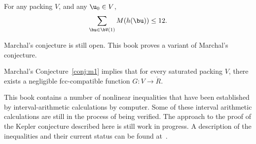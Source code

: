 \begin{conjecture}[Marchal]\label{conj:m1} For any packing $ V$, and
any $ \u_0\in V$,
\begin{displaymath}
\sum_{\bu\in \bV(1)} M(h(\bu)) \le 12.
\end{displaymath}
\end{conjecture}

Marchal's conjecture is still open.  This book proves a variant of
Marchal's conjecture.

\begin{theorem}\label{theorem:mk1}
Marchal's Conjecture~\ref{conj:m1} implies
that for every saturated packing $V$, there exists a negligible fcc-compatible function
$G:V\to \ring{R}$.
\end{theorem}

\begin{note}%
This book contains a number of nonlinear inequalities that have been
established by interval-arithmetic calculations by computer.  Some
of these interval arithmetic calculations are still in the process
of being verified.  The approach to the proof of the Kepler
conjecture described here is still work in progress.  A description
of the inequalities and their current status can be found
at~\cite{hales:2009:nonlinear}.
\end{note}

